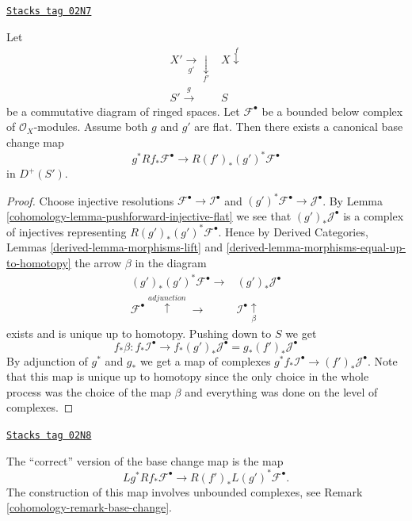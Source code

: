 \begin{lemma}
\label{cohomology-lemma-base-change-map-flat-case}
\href{https://stacks.math.columbia.edu/tag/02N7}{\texttt{Stacks tag 02N7}}

Let
$$
\begin{array}{cc}X' \underset{g'}{\longrightarrow}\underset{f'}{\downarrow} & X \overset{f}{\downarrow} \\ S' \overset{g}{\longrightarrow} & S\end{array}
$$
be a commutative diagram of ringed spaces.
Let $\mathcal{F}^\bullet$ be a bounded below complex of
$\mathcal{O}_X$-modules.
Assume both $g$ and $g'$ are flat.
Then there exists a canonical base change map
$$
g^*Rf_*\mathcal{F}^\bullet
\longrightarrow
R(f')_*(g')^*\mathcal{F}^\bullet
$$
in $D^{+}(S')$.
\end{lemma}

\begin{proof}

Choose injective resolutions $\mathcal{F}^\bullet \to \mathcal{I}^\bullet$
and $(g')^*\mathcal{F}^\bullet \to \mathcal{J}^\bullet$.
By Lemma \ref{cohomology-lemma-pushforward-injective-flat} we see that
$(g')_*\mathcal{J}^\bullet$ is a complex of injectives representing
$R(g')_*(g')^*\mathcal{F}^\bullet$. Hence by
Derived Categories, Lemmas \ref{derived-lemma-morphisms-lift}
and \ref{derived-lemma-morphisms-equal-up-to-homotopy}
the arrow $\beta$ in the diagram
$$
\begin{array}{cc}(g')_*(g')^*\mathcal{F}^\bullet \longrightarrow & (g')_*\mathcal{J}^\bullet \\ \mathcal{F}^\bullet \overset{adjunction}{\uparrow}\longrightarrow & \mathcal{I}^\bullet \underset{\beta}{\uparrow}\end{array}
$$
exists and is unique up to homotopy.
Pushing down to $S$ we get
$$
f_*\beta :
f_*\mathcal{I}^\bullet
\longrightarrow
f_*(g')_*\mathcal{J}^\bullet
=
g_*(f')_*\mathcal{J}^\bullet
$$
By adjunction of $g^*$ and $g_*$ we get a map of complexes
$g^*f_*\mathcal{I}^\bullet \to (f')_*\mathcal{J}^\bullet$.
Note that this map is unique up to homotopy since the only
choice in the whole process was the choice of the map $\beta$
and everything was done on the level of complexes.
\end{proof}

\begin{remark}
\label{cohomology-remark-correct-version-base-change-map}
\href{https://stacks.math.columbia.edu/tag/02N8}{\texttt{Stacks tag 02N8}}

The ``correct'' version of the base change map is the map
$$
Lg^* Rf_* \mathcal{F}^\bullet
\longrightarrow
R(f')_* L(g')^*\mathcal{F}^\bullet.
$$
The construction of this map involves
unbounded complexes, see Remark \ref{cohomology-remark-base-change}.
\end{remark}

